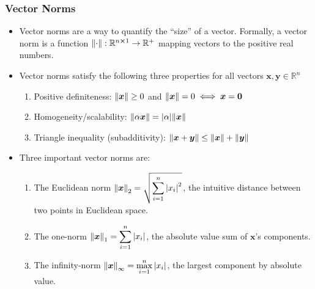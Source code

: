 \documentclass[11pt, a4paper]{article}
\newcommand{\R}{\mathbb{R}} %
\begin{document}
\subsubsection{Vector Norms}
\begin{itemize}
	\item Vector norms are a way to quantify the ``size'' of a vector. Formally, a vector norm is a function $ \norm{\cdot}: \R^{n \cross 1} \to \R^{+} $ mapping vectors to the positive real numbers. 
	
	\item Vector norms satisfy the following three properties for all vectors $ \bm{x}, \bm{y} \in \R^{n} $
	\begin{enumerate}
		\item Positive definiteness: $\norm{\bm{x}} \geq 0 $ and $  \norm{\bm{x}} = 0 \iff \bm{x} = \bm{0}$
		\item Homogeneity/scalability: $ \norm{\alpha \bm{x}} = \abs{\alpha} \norm{\bm{x}}$
		\item Triangle inequality (subadditivity): $\norm{\bm{x} + \bm{y}} \leq \norm{\bm{x}} + \norm{\bm{y}} $
	\end{enumerate}
	
	\item Three important vector norms are:
	\begin{enumerate}
		\item The Euclidean norm $ \displaystyle{\norm{\bm{x}}}_2 = \sqrt{\sum_{i = 1}^{n}\abs{x_i}^2}  $, the intuitive distance between two points in Euclidean space.
		
		\item The one-norm $ \displaystyle{\norm{\bm{x}}}_1 = \sum_{i = 1}^{n}\abs{x_i}  $, the absolute value sum of $ \bm{x} $'s components. 
				
		\item The infinity-norm $ \displaystyle{\norm{\bm{x}}}_\infty = \max_{i= 1}^{n} \abs{x_i} $, the largest component by absolute value.
		
	\end{enumerate}
	
\end{itemize}
\end{document}
